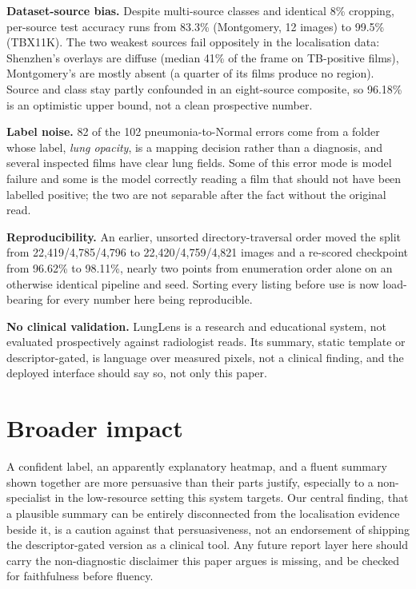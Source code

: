 \documentclass{article}
\begin{document}
\textbf{Dataset-source bias.} Despite multi-source classes and identical 8\% cropping, per-source test accuracy runs from 83.3\% (Montgomery, 12 images) to 99.5\% (TBX11K). The two weakest sources fail oppositely in the localisation data: Shenzhen's overlays are diffuse (median 41\% of the frame on TB-positive films), Montgomery's are mostly absent (a quarter of its films produce no region). Source and class stay partly confounded in an eight-source composite, so 96.18\% is an optimistic upper bound, not a clean prospective number.

\textbf{Label noise.} 82 of the 102 pneumonia-to-Normal errors come from a folder whose label, \emph{lung opacity}, is a mapping decision rather than a diagnosis, and several inspected films have clear lung fields. Some of this error mode is model failure and some is the model correctly reading a film that should not have been labelled positive; the two are not separable after the fact without the original read.

\textbf{Reproducibility.} An earlier, unsorted directory-traversal order moved the split from 22{,}419/4{,}785/4{,}796 to 22{,}420/4{,}759/4{,}821 images and a re-scored checkpoint from 96.62\% to 98.11\%, nearly two points from enumeration order alone on an otherwise identical pipeline and seed. Sorting every listing before use is now load-bearing for every number here being reproducible.

\textbf{No clinical validation.} LungLens is a research and educational system, not evaluated prospectively against radiologist reads. Its summary, static template or descriptor-gated, is language over measured pixels, not a clinical finding, and the deployed interface should say so, not only this paper.

\section{Broader impact}
A confident label, an apparently explanatory heatmap, and a fluent summary shown together are more persuasive than their parts justify, especially to a non-specialist in the low-resource setting this system targets. Our central finding, that a plausible summary can be entirely disconnected from the localisation evidence beside it, is a caution against that persuasiveness, not an endorsement of shipping the descriptor-gated version as a clinical tool. Any future report layer here should carry the non-diagnostic disclaimer this paper argues is missing, and be checked for faithfulness before fluency.
\end{document}
